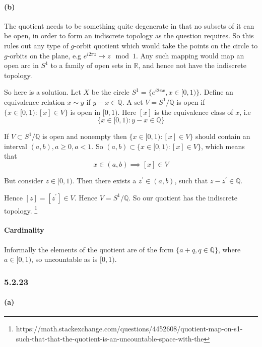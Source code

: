 \documentclass{article}
\begin{document}
\paragraph{(b)}

The quotient needs to be something quite degenerate in that no subsets of it can be open, in order to form an indiscrete topology as the question requires. So this rules out any type of $g$-orbit quotient which would take the points on the circle to $g$-orbits on the plane, e.g $e^{i2\pi z} \mapsto z \mod 1$. Any such mapping would map an open arc in $S^1$ to a family of open sets in $\mathds{R}$, and hence not have the indiscrete topology.

So here is a solution. Let $X$ be the circle $S^1= \{e^{i2\pi x}, x \in [0,1)\}$. Define an equivalence relation $x \sim y$ if $y - x \in \mathds{Q}$. A set $V=S^1/\mathds{Q}$ is open if $\{x \in [0,1)\colon [x] \in V \}$ is open in $[0,1)$. Here $[x]$ is the equivalence class of $x$, i.e
\begin{equation*}
  \{ x \in [0,1)\colon y - x \in \mathds{Q} \}
\end{equation*}

If $V \subset S^1/\mathds{Q}$ is open and nonempty then $\{ x \in [0,1): [x] \in V  \}$ should contain an interval $(a,b), a \ge 0, a < 1$. So $(a,b) \subset \{ x \in [0,1): [x] \in V  \}$, which means that
\begin{equation*}
  x \in (a,b) \implies [x] \in V
\end{equation*}

But consider $z \in [0,1)$. Then there exists a $z^\prime \in (a,b)$, such that $z - z^\prime \in \mathds{Q}$.

Hence $[z] = [z^\prime] \in V$. Hence $V = S^1/\mathds{Q}$. So our quotient has the indiscrete topology.  \footnote{https://math.stackexchange.com/questions/4452608/quotient-map-on-s1-such-that-that-the-quotient-is-an-uncountable-space-with-the}
\paragraph{Cardinality}  Informally the elements of the quotient are of the form $\{ a + q, q \in \mathds{Q} \}$, where $a \in [0,1)$, so uncountable as is $[0,1)$.

\subsubsection*{5.2.23}
\paragraph{(a)}
\end{document}
